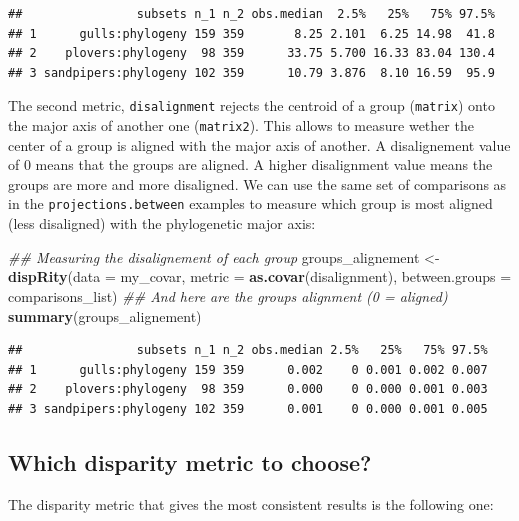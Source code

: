 \documentclass[
]{book}
\newenvironment{Shaded}{\begin{snugshade}}{\end{snugshade}}
\newcommand{\CommentTok}[1]{\textcolor[rgb]{0.56,0.35,0.01}{\textit{#1}}}
\newcommand{\DataTypeTok}[1]{\textcolor[rgb]{0.13,0.29,0.53}{#1}}
\newcommand{\KeywordTok}[1]{\textcolor[rgb]{0.13,0.29,0.53}{\textbf{#1}}}
\newcommand{\NormalTok}[1]{#1}
\newcommand{\StringTok}[1]{\textcolor[rgb]{0.31,0.60,0.02}{#1}}
\begin{document}
\begin{verbatim}
##                subsets n_1 n_2 obs.median  2.5%   25%   75% 97.5%
## 1      gulls:phylogeny 159 359       8.25 2.101  6.25 14.98  41.8
## 2    plovers:phylogeny  98 359      33.75 5.700 16.33 83.04 130.4
## 3 sandpipers:phylogeny 102 359      10.79 3.876  8.10 16.59  95.9
\end{verbatim}

The second metric, \texttt{disalignment} rejects the centroid of a group (\texttt{matrix}) onto the major axis of another one (\texttt{matrix2}).
This allows to measure wether the center of a group is aligned with the major axis of another.
A disalignement value of 0 means that the groups are aligned. A higher disalignment value means the groups are more and more disaligned.
We can use the same set of comparisons as in the \texttt{projections.between} examples to measure which group is most aligned (less disaligned) with the phylogenetic major axis:

\begin{Shaded}
\begin{Highlighting}[]
\CommentTok{\#\# Measuring the disalignement of each group}
\NormalTok{groups\_alignement \textless{}{-}}\StringTok{ }\KeywordTok{dispRity}\NormalTok{(}\DataTypeTok{data =}\NormalTok{ my\_covar,}
                              \DataTypeTok{metric =} \KeywordTok{as.covar}\NormalTok{(disalignment),}
                              \DataTypeTok{between.groups =}\NormalTok{ comparisons\_list)}
\CommentTok{\#\# And here are the groups alignment (0 = aligned)}
\KeywordTok{summary}\NormalTok{(groups\_alignement)}
\end{Highlighting}
\end{Shaded}

\begin{verbatim}
##                subsets n_1 n_2 obs.median 2.5%   25%   75% 97.5%
## 1      gulls:phylogeny 159 359      0.002    0 0.001 0.002 0.007
## 2    plovers:phylogeny  98 359      0.000    0 0.000 0.001 0.003
## 3 sandpipers:phylogeny 102 359      0.001    0 0.000 0.001 0.005
\end{verbatim}

\hypertarget{which-disparity-metric-to-choose}{%
\subsection{Which disparity metric to choose?}\label{which-disparity-metric-to-choose}}

The disparity metric that gives the most consistent results is the following one:
\end{document}
